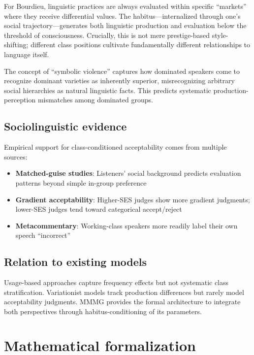 \documentclass[12pt]{article}
\begin{document}
For Bourdieu, linguistic practices are always evaluated within specific \enquote{markets} where they receive differential values. The habitus—internalized through one's social trajectory—generates both linguistic production and evaluation below the threshold of consciousness. Crucially, this is not mere prestige-based style-shifting; different class positions cultivate fundamentally different relationships to language itself.

The concept of \enquote{symbolic violence} captures how dominated speakers come to recognize dominant varieties as inherently superior, misrecognizing arbitrary social hierarchies as natural linguistic facts. This predicts systematic production-perception mismatches among dominated groups.

\subsection{Sociolinguistic evidence}

Empirical support for class-conditioned acceptability comes from multiple sources:

\begin{itemize}
\item \textbf{Matched-guise studies}: Listeners' social background predicts evaluation patterns beyond simple in-group preference \parencite{campbell-kibler2007}
\item \textbf{Gradient acceptability}: Higher-SES judges show more gradient judgments; lower-SES judges tend toward categorical accept/reject \parencite{adli2004}
\item \textbf{Metacommentary}: Working-class speakers more readily label their own speech \enquote{incorrect} \parencite{preston1989}
\end{itemize}

\subsection{Relation to existing models}

Usage-based approaches capture frequency effects but not systematic class stratification. Variationist models track production differences but rarely model acceptability judgments. MMMG provides the formal architecture to integrate both perspectives through habitus-conditioning of its parameters.

\section{Mathematical formalization}
\end{document}
